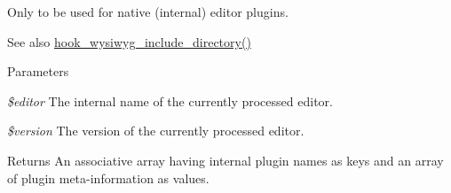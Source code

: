 Only to be used for native (internal) editor plugins.

\begin{DoxySeeAlso}{See also}
\hyperlink{wysiwyg_8api_8php_a6cfdf97fd9de777197d9bae384755aac}{hook\_\-wysiwyg\_\-include\_\-directory()}
\end{DoxySeeAlso}

\begin{DoxyParams}{Parameters}
\item[{\em \$editor}]The internal name of the currently processed editor. \item[{\em \$version}]The version of the currently processed editor.\end{DoxyParams}
\begin{DoxyReturn}{Returns}
An associative array having internal plugin names as keys and an array of plugin meta-\/information as values. 
\end{DoxyReturn}
